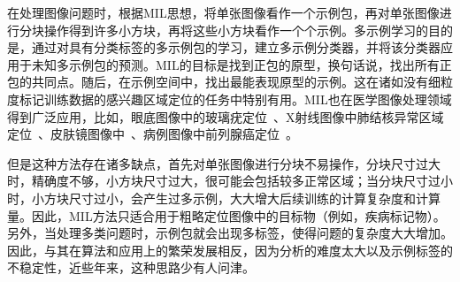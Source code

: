 在处理图像问题时，根据MIL思想，将单张图像看作一个示例包，再对单张图像进行分块操作得到许多小方块，再将这些小方块看作一个个示例。多示例学习的目的是，通过对具有分类标签的多示例包的学习，建立多示例分类器，并将该分类器应用于未知多示例包的预测。MIL的目标是找到正包的原型，换句话说，找出所有正包的共同点。随后，在示例空间中，找出最能表现原型的示例。这在诸如没有细粒度标记训练数据的感兴趣区域定位的任务中特别有用。MIL也在医学图像处理领域得到广泛应用，比如，眼底图像中的玻璃疣定位~\cite{lu2015effective}、X射线图像中肺结核异常区域定位~\cite{melendez2014novel}、皮肤镜图像中~\cite{madooei2018learning}、病例图像中前列腺癌定位~\cite{campanella2018terabyte}。

但是这种方法存在诸多缺点，首先对单张图像进行分块不易操作，分块尺寸过大时，精确度不够，小方块尺寸过大，很可能会包括较多正常区域；当分块尺寸过小时，小方块尺寸过小，会产生过多示例，大大增大后续训练的计算复杂度和计算量。因此，MIL方法只适合用于粗略定位图像中的目标物（例如，疾病标记物）。另外，当处理多类问题时，示例包就会出现多标签，使得问题的复杂度大大增加。因此，与其在算法和应用上的繁荣发展相反，因为分析的难度太大以及示例标签的不稳定性，近些年来，这种思路少有人问津。

